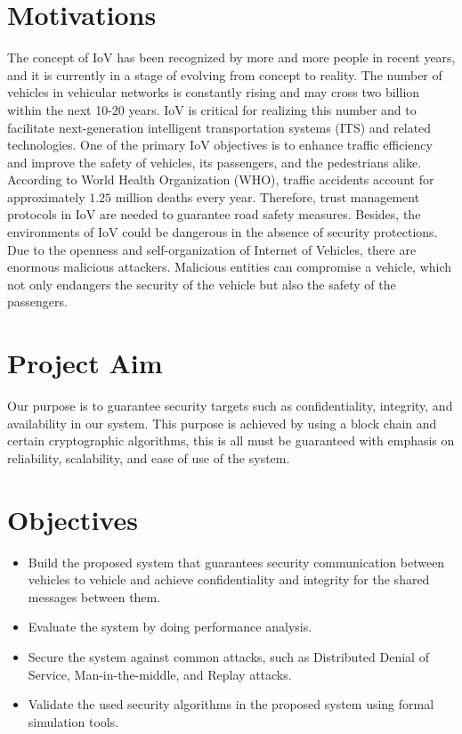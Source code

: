 	\section{Motivations}
		\label{}
		The concept of IoV has been recognized by more and more people in recent years, and it is currently in a stage of evolving from concept to reality. The number of vehicles in vehicular networks is constantly rising and may cross two billion within the next 10-20 years. IoV is critical for realizing this number and to facilitate next-generation intelligent transportation systems (ITS) and related technologies. One of the primary IoV objectives is to enhance traffic efficiency and improve the safety of vehicles, its passengers, and the pedestrians alike. According to World Health Organization (WHO), traffic accidents account for approximately $1.25$ million deaths every year. Therefore, trust management protocols in IoV are needed to guarantee road safety measures. Besides, the environments of IoV could be dangerous in the absence of security protections. Due to the openness and self-organization of Internet of Vehicles, there are enormous malicious attackers. Malicious entities can compromise a vehicle, which not only endangers the security of the vehicle but also the safety of the passengers. 
	
	\section{Project Aim}
		\label{}
		Our purpose is to guarantee security targets such as confidentiality, integrity, and availability in our system. This purpose is achieved by using a block chain and certain cryptographic algorithms, this is all must be guaranteed with emphasis on reliability, scalability, and ease of use of the system. 
	
	\section{Objectives}
		\label{}
		\begin{itemize}
			\item Build the proposed system that guarantees security communication between vehicles to vehicle and achieve confidentiality and integrity for the shared messages between them. 
			\item Evaluate the system by doing performance analysis. 
			\item Secure the system against common attacks, such as Distributed Denial of Service, Man-in-the-middle, and Replay attacks. 
			\item Validate the used security algorithms in the proposed system using formal simulation tools. 
		\end{itemize}
	
